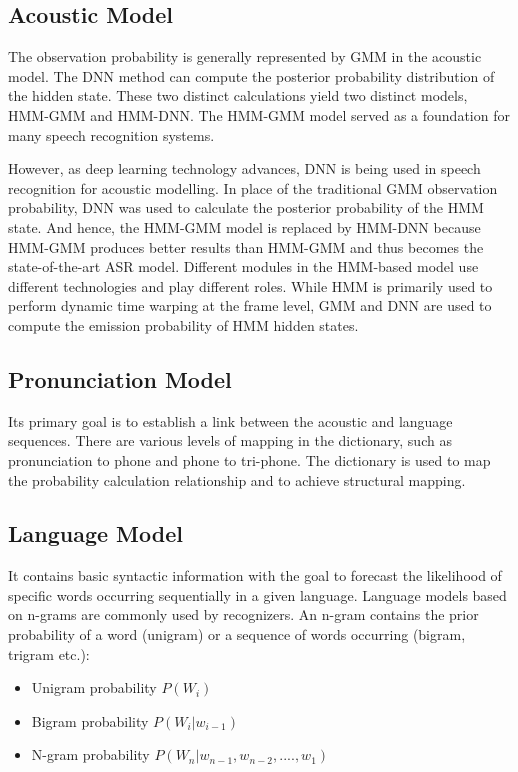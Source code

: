 \subsection{Acoustic Model}
\label{sub:acoustic_model}
The observation probability is generally represented by GMM in the acoustic model. The DNN method can compute the posterior probability distribution of the hidden state. These two distinct calculations yield two distinct models, HMM-GMM and HMM-DNN. The HMM-GMM model served as a foundation for many speech recognition systems.

However, as deep learning technology advances, DNN is being used in speech recognition for acoustic modelling. In place of the traditional GMM observation probability, DNN was used to calculate the posterior probability of the HMM state. And hence, the HMM-GMM model is replaced by HMM-DNN because HMM-GMM produces better results than HMM-GMM and thus becomes the state-of-the-art ASR model. Different modules in the HMM-based model use different technologies and play different roles. While HMM is primarily used to perform dynamic time warping at the frame level, GMM and DNN are used to compute the emission probability of HMM hidden states.

\subsection{Pronunciation Model}
\label{sub:Pronounciation_model}

Its primary goal is to establish a link between the acoustic and language sequences. There are various levels of mapping in the dictionary, such as pronunciation to phone and phone to tri-phone. The dictionary is used to map the probability calculation relationship and to achieve structural mapping.

\subsection{Language Model}
\label{sub:language_model}

It contains basic syntactic information with the goal to forecast the likelihood of specific words occurring sequentially in a given language. Language models based on n-grams are commonly used by recognizers. An n-gram contains the prior probability of a word (unigram) or a sequence of words occurring (bigram, trigram etc.):

\begin{itemize}
    \item Unigram probability $P(W_{i})$
    \item Bigram probability $P(W_{i}|w_{i-1})$ 
    \item N-gram probability $P(W_{n}|w_{n-1},w_{n-2},....,w_{1})$
\end{itemize}

